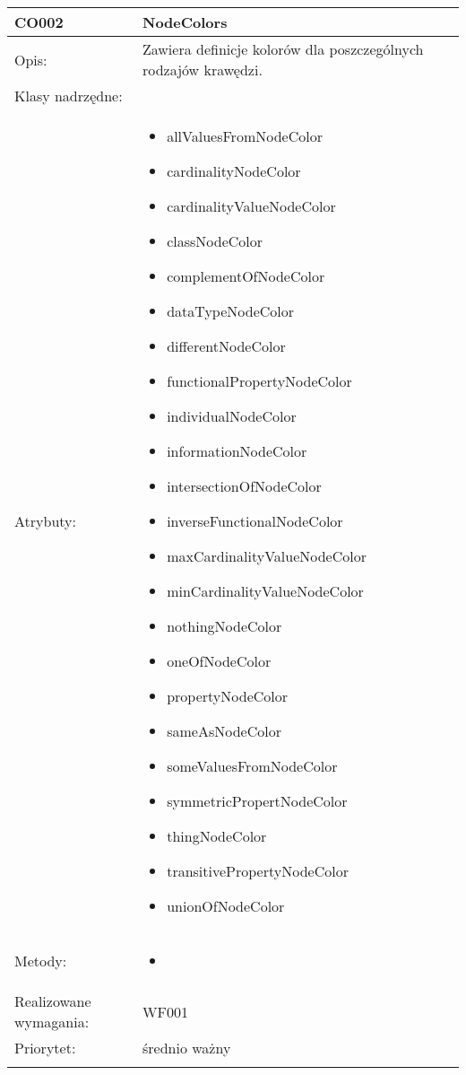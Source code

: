 \documentclass[a4paper,10pt]{article}
\begin{document}
\begin{center}
\begin{longtable}{|m{3cm}|m{9cm}|}
CO002 & NodeColors \\ \hline
Opis: & Zawiera definicje kolorów dla poszczególnych rodzajów krawędzi.   \\ \hline
Klasy nadrzędne: &     \\ \hline
Atrybuty: & \begin{itemize}
 \item allValuesFromNodeColor
 \item cardinalityNodeColor
 \item cardinalityValueNodeColor
 \item classNodeColor
 \item complementOfNodeColor
 \item dataTypeNodeColor
 \item differentNodeColor
 \item functionalPropertyNodeColor
 \item individualNodeColor
 \item informationNodeColor
 \item intersectionOfNodeColor
 \item inverseFunctionalNodeColor
 \item maxCardinalityValueNodeColor
 \item minCardinalityValueNodeColor
 \item nothingNodeColor
 \item oneOfNodeColor
 \item propertyNodeColor
 \item sameAsNodeColor
 \item someValuesFromNodeColor
 \item symmetricPropertNodeColor
 \item thingNodeColor
 \item transitivePropertyNodeColor
 \item unionOfNodeColor 
\end{itemize}
 \\ \hline
Metody: & \begin{itemize}
 \item 
\end{itemize}
  \\ \hline
Realizowane wymagania: & WF001 \\ \hline
Priorytet: & średnio ważny \\ \hline

\multicolumn{2}{c}{} \\
 \hline

\end{longtable}


\end{center}
\end{document}
